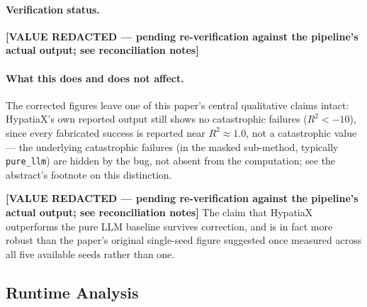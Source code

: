 \documentclass[twoside,11pt]{article}
\newcommand{\Rsq}{R^{2}}
\begin{document}
\paragraph{Verification status.}
\textbf{[VALUE REDACTED --- pending re-verification against the pipeline's actual output; see reconciliation notes]}

\paragraph{What this does and does not affect.} The corrected figures leave
one of this paper's central qualitative claims intact: HypatiaX's own
reported output still shows no catastrophic failures ($\Rsq < -10$), since
every fabricated success is reported near $\Rsq \approx 1.0$, not a
catastrophic value --- the underlying catastrophic failures (in the masked
sub-method, typically \texttt{pure\_llm}) are hidden by the bug, not absent
from the computation; see the abstract's footnote on this distinction.

\textbf{[VALUE REDACTED --- pending re-verification against the pipeline's actual output; see reconciliation notes]}
The claim that HypatiaX outperforms the pure LLM baseline
survives correction, and is in fact more robust than the paper's
original single-seed figure suggested once measured across all five
available seeds rather than one.

\subsection{Runtime Analysis}\label{subsec:runtime-analysis}
\label{sec:timing}
\end{document}
